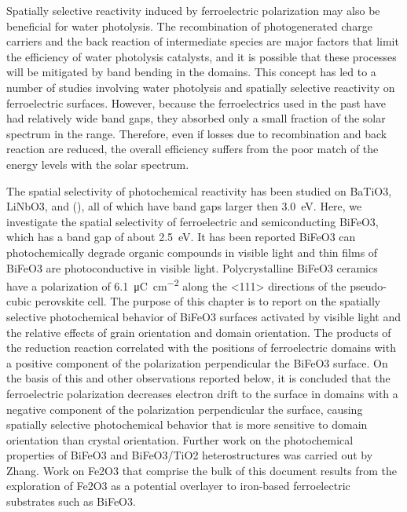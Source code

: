 \documentclass[12pt,%
              twoside,
               letterpaper]{uiothesis}
\begin{document}
Spatially selective reactivity induced by ferroelectric polarization may also be
beneficial for water photolysis. The recombination of photogenerated charge carriers and
the back reaction of intermediate species are major factors that limit the efficiency of
water photolysis catalysts,\cite{Kudo:2008fk,Domen:1996um} and it is possible that these
processes will be mitigated by band bending in the domains. This concept has led to a
number of studies involving water
photolysis\cite{Inoue:2009bh,Inoue:1990vc,Anonymous:lTM5YSKy} and spatially selective
reactivity on ferroelectric
surfaces.\cite{Giocondi:2001gz,Burbure:2010go,Giocondi:2001bi,Burbure:2010ti,Bhardwaj:2010eh,%
Giocondi:2008ja,Bhardwaj:2010ef} However, because the ferroelectrics used in the
past have had relatively wide band gaps, they absorbed only a small fraction of the solar
spectrum in the  range. Therefore, even if losses due to recombination and back
reaction are reduced, the overall efficiency suffers from the poor match of the energy
levels with the solar spectrum.

The spatial selectivity of photochemical reactivity has been studied on
BaTiO3,\cite{Giocondi:2001gz,Burbure:2010go,Burbure:2010ti,Bhardwaj:2010eh}
LiNbO3,\cite{Hanson:2006bq} and 
(),\cite{Kalinin:2002iw,Tiwari:2009jv} all of which have band gaps larger then
\SI{3.0}{\electronvolt}. Here, we investigate the spatial selectivity of ferroelectric and
semiconducting BiFeO3, which has a band gap of about
\SI{2.5}{\electronvolt}.\cite{Basu:2008hd,Choi:2009gh,Gao:2006fg} It has been reported
BiFeO3 can photochemically degrade organic compounds in visible
light\cite{Cho:2008ki,Gao:2007eb} and thin films of BiFeO3 are photoconductive in
visible light.\cite{Basu:2008hd} Polycrystalline BiFeO3 ceramics have a polarization
of \SI{6.1}{\micro\coulomb\per\centi\meter\squared} along the <111> directions of the
pseudo-cubic perovskite cell.\cite{Anonymous:2011wx} The purpose of this chapter is to
report on the spatially selective photochemical behavior of BiFeO3 surfaces activated
by visible light and the relative effects of grain orientation and domain orientation. The
products of the reduction reaction correlated with the positions of ferroelectric domains
with a positive component of the polarization perpendicular the BiFeO3 surface. On
the basis of this and other observations reported below, it is concluded that the
ferroelectric polarization decreases electron drift to the surface in domains with a
negative component of the polarization perpendicular the surface, causing spatially
selective photochemical behavior that is more sensitive to domain orientation than crystal
orientation. Further work on the photochemical properties of BiFeO3 and
BiFeO3/TiO2 heterostructures was carried out by Zhang.\cite{Zhang:2011cj} Work
on Fe2O3 that comprise the bulk of this document results from the exploration of
Fe2O3 as a potential overlayer to iron-based ferroelectric substrates such as
BiFeO3.
\end{document}
